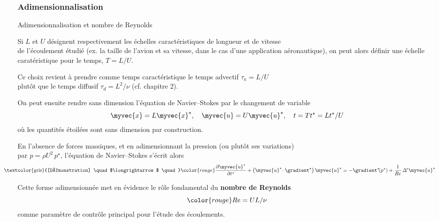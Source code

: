\subsubsection{Adimensionnalisation}
\begin{frame}{Adimensionnalisation et nombre de Reynolds}

\small

Si $L$ et $U$ désignent respectivement les échelles caractéristiques de longueur et de vitesse 
\\
de l'écoulement étudié (ex. la taille de l'avion et sa vitesse, dans le cas d'une application aéronautique), 
on peut alors définir une échelle caratéristique pour le temps, $T=L/U$.

\medskip

Ce choix revient à prendre comme temps caractéristique 
le temps advectif $\tau_a=L/U$ \\ plutôt que le temps diffusif 
$\tau_d = L^2/\nu$ (cf. chapitre 2).

\medskip
\pause

On peut ensuite rendre sans dimension l'équation de Navier--Stokes par le changement de variable 
\[
	\myvec{x} = L \myvec{x}^\star, 
	\quad \myvec{u} = U \myvec{u}^\star, 
	\quad t = T t^\star=L t^\star/U
\]
où les quantités étoilées sont sans dimension par construction.

\medskip

\pause

En l'absence de forces massiques, et en adimensionnant la pression (ou plutôt ses variations) 
\\
par $p = \rho U^2 \, p^\star$, l'équation de Navier--Stokes s'écrit alors
\begin{equation}
	\hspace*{-10mm}
	\mbox{\textcolor{gris}{[Démonstration] \quad $\longrightarrow$ \quad}}
	\color{rouge}
	\frac{\partial \myvec{u}^\star}{\partial t^\star} 
	+ \left ( \myvec{u}^\star \! \cdot \gradient^\star \right )\myvec{u}^\star
	=
	-
	\gradient^\star\!\! \left (p^\star \right)
	+
	\frac{1}{Re} \, \Delta\!^\star \myvec{u}^\star 
\end{equation}

\medskip
\pause
Cette forme adimensionnée met en évidence le rôle fondamental du \textbf{nombre de Reynolds} 
\[
	\color{rouge}Re=UL/\nu
\] 
comme paramètre de contrôle principal pour l'étude des écoulements.

\vspace{10mm}

\end{frame}



